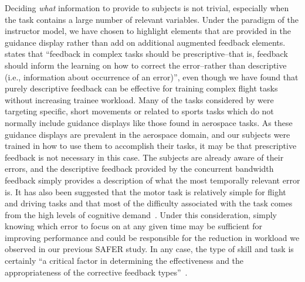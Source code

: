 Deciding \textit{what} information to provide to subjects is not trivial, especially when the task contains a large number of relevant variables.
Under the paradigm of the instructor model, we have chosen to highlight elements that are provided in the guidance display rather than add on additional augmented feedback elements.
\citeauthor{sigrist_augmented_2013} states that ``feedback in complex tasks should be prescriptive--that is, feedback should inform the learning on how to correct the error--rather than descriptive (i.e., information about occurrence of an error)'', even though we have found that purely descriptive feedback can be effective for training complex flight tasks without increasing trainee workload.
Many of the tasks considered by \citeauthor{sigrist_augmented_2013} were targeting specific, short movements or related to sports tasks which do not normally include guidance displays like those found in aerospace tasks.
As these guidance displays are prevalent in the aerospace domain, and our subjects were trained in how to use them to accomplish their tasks, it may be that prescriptive feedback is not necessary in this case.
The subjects are already aware of their errors, and the descriptive feedback provided by the concurrent bandwidth feedback simply provides a description of what the most temporally relevant error is.
It has also been suggested that the motor task is relatively simple for flight and driving tasks and that most of the difficulty associated with the task comes from the high levels of cognitive demand~\citep{doi:10.1080/00222899709600829}.
Under this consideration, simply knowing which error to focus on at any given time may be sufficient for improving performance and could be responsible for the reduction in workload we observed in our previous SAFER study.
In any case, the type of skill and task is certainly ``a critical factor in determining the effectiveness and the appropriateness of the corrective feedback types''~\citep{Tzetzis2008}.

